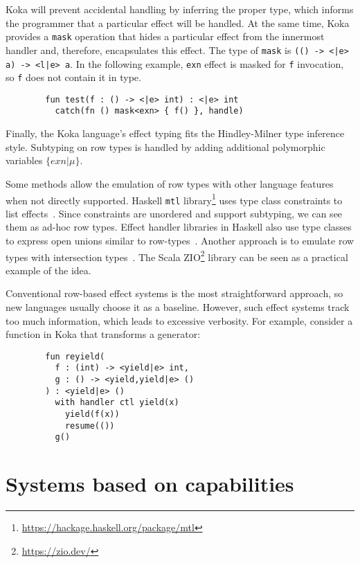 \documentclass[conference]{IEEEtran}
\begin{document}
    Koka will prevent accidental handling by inferring the proper type, which informs the programmer that a particular effect will be handled.
    At the same time, Koka provides a \texttt{mask} operation that hides a particular effect from the innermost handler and, therefore, encapsulates this effect.
    The type of \texttt{mask} is \texttt{(() -> <|e> a) -> <l|e> a}.
    In the following example, \texttt{exn} effect is masked for \texttt{f} invocation, so \texttt{f} does not contain it in type.
    \begin{verbatim}
        fun test(f : () -> <|e> int) : <|e> int
          catch(fn () mask<exn> { f() }, handle)
    \end{verbatim}

    Finally, the Koka language's effect typing fits the Hindley-Milner type inference style.
    Subtyping on row types is handled by adding additional polymorphic variables $\{exn|\mu\}$.


    Some methods allow the emulation of row types with other language features when not directly supported.
    Haskell \texttt{mtl} library\footnote{\url{https://hackage.haskell.org/package/mtl}} uses type class constraints to list effects~\cite{jones1995functional}.
    Since constraints are unordered and support subtyping, we can see them as ad-hoc row types.
    Effect handler libraries in Haskell also use type classes to express open unions similar to row-types~\cite{swierstra2008data}.
    Another approach is to emulate row types with intersection types~\cite{xie2020row}.
    The Scala ZIO\footnote{\url{https://zio.dev/}} library can be seen as a practical example of the idea.

    Conventional row-based effect systems is the most straightforward approach, so new languages usually choose it as a baseline.
    However, such effect systems track too much information, which leads to excessive verbosity.
    For example, consider a function in Koka that transforms a generator:
    \begin{verbatim}
        fun reyield(
          f : (int) -> <yield|e> int,
          g : () -> <yield,yield|e> ()
        ) : <yield|e> ()
          with handler ctl yield(x)
            yield(f(x))
            resume(())
          g()
    \end{verbatim}


    \section{Systems based on capabilities} \label{sec:capabilities}
\end{document}
